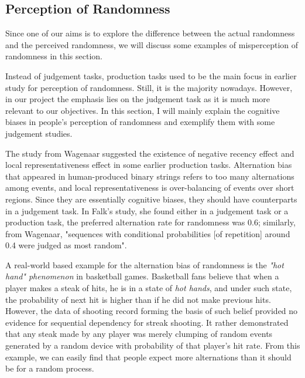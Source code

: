 \documentclass[12pt]{article}
\theoremstyle{plain}
\theoremstyle{definition}
\theoremstyle{remark}
\begin{document}
\newpage
\subsection{Perception of Randomness}
Since one of our aims is to explore the difference between the actual randomness and the perceived randomness, we will discuss some examples of misperception of randomness in this section.

Instead of judgement tasks, production tasks used to be the main focus in earlier study for perception of randomness. Still, it is the majority nowadays. However, in our project the emphasis lies on the judgement task as it is much more relevant to our objectives. In this section, I will mainly explain the cognitive biases in people's perception of randomness and exemplify them with some judgement studies.

The study from Wagenaar\cite[434]{1.2} suggested the existence of negative recency effect and local representativeness effect in some earlier production tasks. Alternation bias that appeared in human-produced binary strings refers to too many alternations among events, and local representativeness is over-balancing of events over short regions\cite[434]{1.2}. Since they are essentially cognitive biases, they should have counterparts in a judgement task. In Falk's study\cite[434]{1.2}, she found either in a judgement task or a production task, the preferred alternation rate for randomness was 0.6; similarly, from Wagenaar\cite[435]{1.2}, "sequences with conditional probabilities [of repetition] around 0.4 were judged as most random".

A real-world based example for the alternation bias of randomness is the \textit{"hot hand" phenomenon} in basketball games. Basketball fans believe that when a player makes a steak of hits, he is in a state of \textit{hot hands}, and under such state, the probability of next hit is higher than if he did not make previous hits. However, the data of shooting record\cite[437]{1.2} forming the basis of such belief provided no evidence for sequential dependency for streak shooting. It rather demonstrated that any steak made by any player was merely clumping of random events generated by a random device with probability of that player's hit rate\cite[437]{1.2}. From this example, we can easily find that people expect more alternations than it should be for a random process.
\end{document}
